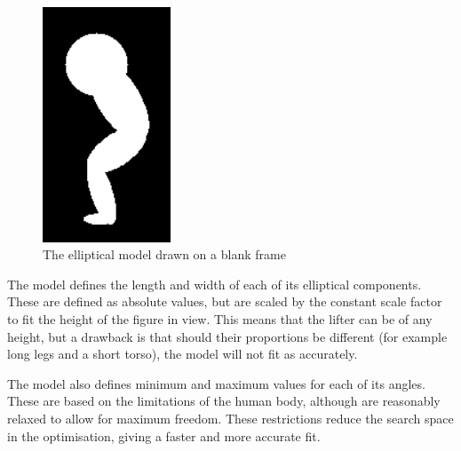 \begin{figure}[H]
    \centering
	\includegraphics[height=7cm]{algorithm/images/model_drawn}
\caption{The elliptical model drawn on a blank frame}
\label{fig:modeldrawn}
\end{figure}

The model defines the length and width of each of its elliptical components. These are defined as absolute values, but are scaled by the constant scale factor to fit the height of the figure in view. This means that the lifter can be of any height, but a drawback is that should their proportions be different (for example long legs and a short torso), the model will not fit as accurately.

The model also defines minimum and maximum values for each of its angles. These are based on the limitations of the human body, although are reasonably relaxed to allow for maximum freedom. These restrictions reduce the search space in the optimisation, giving a faster and more accurate fit.
